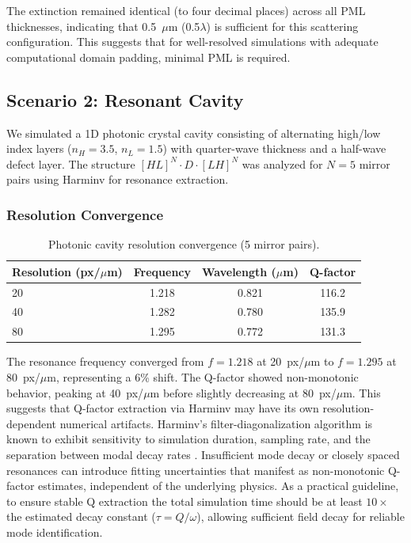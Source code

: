 \documentclass[12pt, a4paper]{article}
\begin{document}
The extinction remained identical (to four decimal places) across all PML thicknesses, indicating that 0.5~$\mu$m (0.5$\lambda$) is sufficient for this scattering configuration. This suggests that for well-resolved simulations with adequate computational domain padding, minimal PML is required.

\subsection{Scenario 2: Resonant Cavity}

We simulated a 1D photonic crystal cavity consisting of alternating high/low index layers ($n_H = 3.5$, $n_L = 1.5$) with quarter-wave thickness and a half-wave defect layer. The structure $[HL]^N \cdot D \cdot [LH]^N$ was analyzed for $N = 5$ mirror pairs using Harminv for resonance extraction.

\subsubsection{Resolution Convergence}

\begin{table}[H]
\centering
\caption{Photonic cavity resolution convergence (5 mirror pairs).}
\label{tab:cavity_resolution}
\begin{tabular}{lccc}
\toprule
Resolution (px/$\mu$m) & Frequency & Wavelength ($\mu$m) & Q-factor \\
\midrule
20 & 1.218 & 0.821 & 116.2 \\
40 & 1.282 & 0.780 & 135.9 \\
80 & 1.295 & 0.772 & 131.3 \\
\bottomrule
\end{tabular}
\end{table}

The resonance frequency converged from $f = 1.218$ at 20~px/$\mu$m to $f = 1.295$ at 80~px/$\mu$m, representing a 6\% shift. The Q-factor showed non-monotonic behavior, peaking at 40~px/$\mu$m before slightly decreasing at 80~px/$\mu$m. This suggests that Q-factor extraction via Harminv may have its own resolution-dependent numerical artifacts. Harminv's filter-diagonalization algorithm is known to exhibit sensitivity to simulation duration, sampling rate, and the separation between modal decay rates \citep{MeepDocs2024}. Insufficient mode decay or closely spaced resonances can introduce fitting uncertainties that manifest as non-monotonic Q-factor estimates, independent of the underlying physics. As a practical guideline, to ensure stable Q extraction the total simulation time should be at least $10\times$ the estimated decay constant ($\tau = Q/\omega$), allowing sufficient field decay for reliable mode identification.
\end{document}
